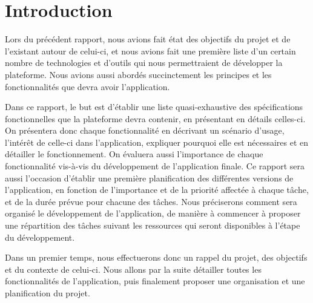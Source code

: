 \section{Introduction}
\label{sec:intro}

	Lors du précédent rapport, nous avions fait état des objectifs du projet et de l'existant autour de celui-ci, et nous avions fait une première liste d'un certain nombre de technologies et d'outils qui nous permettraient de développer la plateforme. Nous avions aussi abordés succinctement les principes et les fonctionnalités que devra avoir l'application. 

	Dans ce rapport, le but est d'établir une liste quasi-exhaustive des spécifications fonctionnelles que la plateforme devra contenir, en présentant en détails celles-ci. On présentera donc chaque fonctionnalité en décrivant un scénario d'usage, l'intérêt de celle-ci dans l'application, expliquer pourquoi elle est nécessaires et en détailler le fonctionnement. On évaluera aussi l'importance de chaque fonctionnalité vis-à-vis du développement de l'application finale. Ce rapport sera aussi l'occasion d'établir une première planification des différentes versions de l'application, en fonction de l'importance et de la priorité affectée à chaque tâche, et de la durée prévue pour chacune des tâches. Nous préciserons comment sera organisé le développement de l'application, de manière à commencer à proposer une répartition des tâches suivant les ressources qui seront disponibles à l'étape du développement.

	Dans un premier temps, nous effectuerons donc un rappel du projet, des objectifs et du contexte de celui-ci. Nous allons par la suite détailler toutes les fonctionnalités de l'application, puis finalement proposer une organisation et une planification du projet.